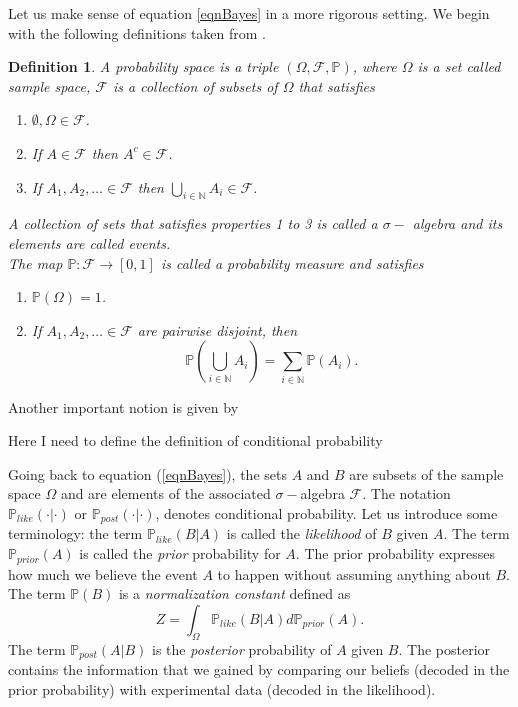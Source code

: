 \documentclass[12pt]{book}
\newtheorem{definition}{Definition}
\newcommand{\post}{\mathbb{P}_{post}}
\newcommand{\like}{\mathbb{P}_{like}}
\newcommand{\prior}{\mathbb{P}_{prior}}
\newcommand{\p}{\mathbb{P}}
\begin{document}
Let us make sense of  equation \ref{eqnBayes} in a more rigorous setting. 
We begin with the following definitions taken from
\cite{dudley2002real}.
\begin{definition}\label{dfnprobabilitytriple}
A probability space is a triple $(\Omega,\mathscr{F},\p)$, where $\Omega$ is a set called 
sample space, $\mathscr{F}$ is a collection of subsets of $\Omega$ that satisfies
\begin{enumerate}
\item $\emptyset,\Omega\in\mathscr{F}$.
\item If $A\in\mathscr{F}$ then $A^{c}\in\mathscr{F}$.
\item If $A_{1},A_{2},\ldots \in\mathscr{F}$ then $\bigcup_{i\in\mathbb{N}}A_{i}\in\mathscr{F}$.
\end{enumerate}
A  collection of sets that satisfies properties 1 to 3 is called a $\sigma-$ algebra and its elements are called
events. 
\\
The map $\p:\mathscr{F}\rightarrow [0,1]$ is called a probability measure and satisfies
\begin{enumerate}
\item $\p(\Omega)=1$.
\item If $A_{1},A_{2},\ldots \in\mathscr{F}$ are pairwise disjoint, then 
\begin{equation*}
\p(\bigcup_{i\in\mathbb{N}}A_{i})=\sum_{i\in\mathbb{N}}\p(A_{i}).
\end{equation*}
\end{enumerate}
\end{definition}
Another important notion is given by

\begin{center}
Here I need to define the definition of conditional probability
\end{center}




Going back to equation (\ref{eqnBayes}), the sets $A$ and $B$ are subsets of the sample space $\Omega$ and 
are elements of the associated $\sigma-$algebra $\mathscr{F}$. The  notation
 $\like(\cdot|\cdot)$ or $\post(\cdot|\cdot)$, denotes conditional probability. Let us introduce some terminology:
 the term $\like(B|A)$ is called the \textit{likelihood} of $B$ given $A$. The term $\prior(A)$ is called the 
\textit{prior} probability for $A$. The prior probability expresses how much we believe the event $A$ 
to happen without assuming
anything about  $B$. The term $\p(B)$ is a \textit{normalization constant} defined as 
\begin{equation}\label{eqnNormalizationConstant}
Z=\int_{\Omega} \like(B|A)d\prior(A).
\end{equation}
The term $\post(A|B)$ is  the \textit{posterior} probability of $A$ given $B$. 
The posterior contains  the information 
that we gained by comparing our beliefs (decoded in the prior probability) with experimental data 
(decoded in the likelihood). 
\newline
\end{document}
